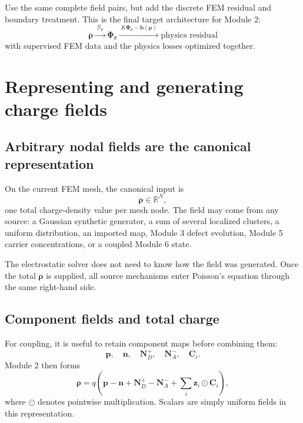 \documentclass[11pt]{article}
\begin{document}
Use the same complete field pairs, but add the discrete FEM residual and boundary treatment. This is the final target architecture for Module 2:
\begin{equation}
\boxed{
\bm{\rho}
\xrightarrow{\;\mathcal{G}_{\theta}\;}
\bm{\Phi}_{\theta}
\xrightarrow{\;K\bm{\Phi}_{\theta}-\bm{b}(\bm{\rho})\;}
\text{physics residual}
}
\end{equation}
with supervised FEM data and the physics losses optimized together.

\section{Representing and generating charge fields}

\subsection{Arbitrary nodal fields are the canonical representation}

On the current FEM mesh, the canonical input is
\begin{equation}
\bm{\rho}\in\mathbb{R}^{N},
\end{equation}
one total charge-density value per mesh node. The field may come from any source: a Gaussian synthetic generator, a sum of several localized clusters, a uniform distribution, an imported map, Module 3 defect evolution, Module 5 carrier concentrations, or a coupled Module 6 state.

The electrostatic solver does not need to know how the field was generated. Once the total $\bm{\rho}$ is supplied, all source mechanisms enter Poisson's equation through the same right-hand side.

\subsection{Component fields and total charge}

For coupling, it is useful to retain component maps before combining them:
\begin{equation}
\bm{p},\quad \bm{n},\quad \bm{N}_D^+,\quad \bm{N}_A^-,\quad \bm{C}_i.
\end{equation}
Module 2 then forms
\begin{equation}
\bm{\rho}=q\left(\bm{p}-\bm{n}+\bm{N}_D^+-\bm{N}_A^-+\sum_i \bm{z}_i\odot\bm{C}_i\right),
\label{eq:discrete_total_charge}
\end{equation}
where $\odot$ denotes pointwise multiplication. Scalars are simply uniform fields in this representation.
\end{document}
